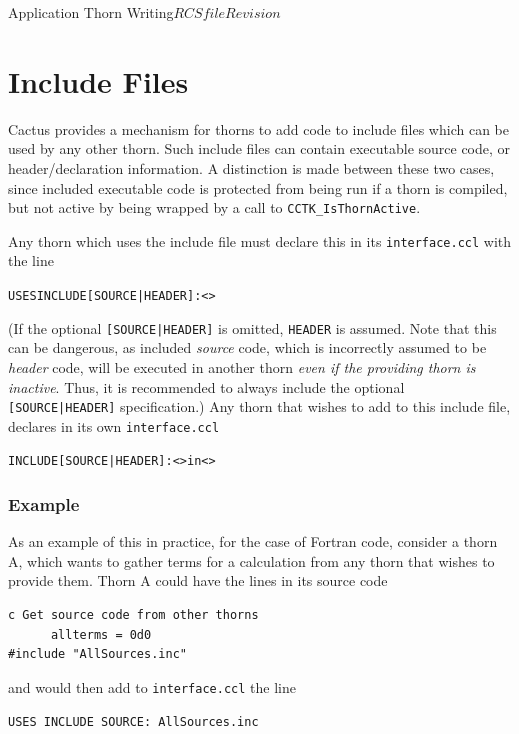 \begin{cactuspart}{Application Thorn Writing}{$RCSfile$}{$Revision$}
\section{Include Files}
\label{sec:includefiles}

Cactus provides a mechanism for thorns to add code to
include files which can be used by any other thorn.
Such include files can contain executable source code, or header/declaration
information. A distinction is made between these two cases, since included
executable code is protected from being run if a thorn is compiled, but
not active by being wrapped by a call to \texttt{CCTK\_IsThornActive}.

Any thorn
which uses the include file must declare this in its
\texttt{interface.ccl} with the line

\begin{alltt}
USES INCLUDE [SOURCE|HEADER]: <>
\end{alltt}

(If the optional \verb![SOURCE|HEADER]! is omitted, \verb|HEADER| is
assumed.  Note that this can be dangerous, as included \emph{source}
code, which is incorrectly assumed to be \emph{header} code, will be
executed in another thorn \emph{even if the providing thorn is
inactive}.  Thus, it is recommended to always include the optional
\verb![SOURCE|HEADER]! specification.)  Any thorn that wishes to add
to this include file, declares in its own \texttt{interface.ccl}

\begin{alltt}
INCLUDE [SOURCE|HEADER]: <> in <>
\end{alltt}

\subsubsection{Example}

As an example of this in practice, for the case of Fortran code,
consider a thorn A, which
wants to gather terms for a calculation from any thorn
that wishes to provide them. Thorn A could have
the lines in its source code

\begin{verbatim}
c Get source code from other thorns
      allterms = 0d0
#include "AllSources.inc"
\end{verbatim}
and would then add to \texttt{interface.ccl} the line
\begin{verbatim}
USES INCLUDE SOURCE: AllSources.inc
\end{verbatim}


\end{cactuspart}
